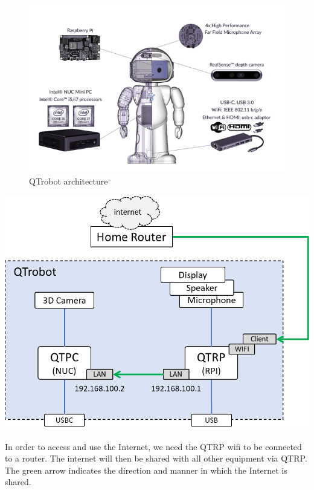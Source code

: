  \begin{figure}[!h]
\centering
 \includegraphics[width=14.25cm]{Figures/qt_architecture.png}
 \caption{QTrobot architecture }
\end{figure}

\begin{minipage}{.55\textwidth}%
\includegraphics[width=\textwidth]{Figures/qt_network.png}
\end{minipage}%
\hfill
\begin{minipage}{.33\textwidth}%
In order to access and use the Internet, we need the QTRP wifi to be connected to a router. The internet will then be shared with all other equipment via QTRP. The green arrow indicates the direction and manner in which the Internet is shared.\\
\end{minipage}%
\vspace*{1.2cm}
